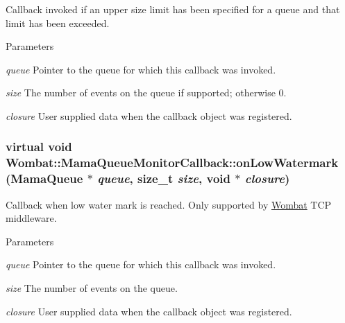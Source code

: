 Callback invoked if an upper size limit has been specified for a queue and that limit has been exceeded. 
\begin{DoxyParams}{Parameters}
\item[{\em queue}]Pointer to the queue for which this callback was invoked. \item[{\em size}]The number of events on the queue if supported; otherwise 0. \item[{\em closure}]User supplied data when the callback object was registered. \end{DoxyParams}
\hypertarget{classWombat_1_1MamaQueueMonitorCallback_abcb11fd28083a7fa3165186111189321}{
\subsubsection[{onLowWatermark}]{\setlength{\rightskip}{0pt plus 5cm}virtual void Wombat::MamaQueueMonitorCallback::onLowWatermark ({\bf MamaQueue} $\ast$ {\em queue}, \/  size\_\-t {\em size}, \/  void $\ast$ {\em closure})}}
\label{classWombat_1_1MamaQueueMonitorCallback_abcb11fd28083a7fa3165186111189321}


Callback when low water mark is reached. Only supported by \hyperlink{namespaceWombat}{Wombat} TCP middleware.


\begin{DoxyParams}{Parameters}
\item[{\em queue}]Pointer to the queue for which this callback was invoked. \item[{\em size}]The number of events on the queue. \item[{\em closure}]User supplied data when the callback object was registered. \end{DoxyParams}

